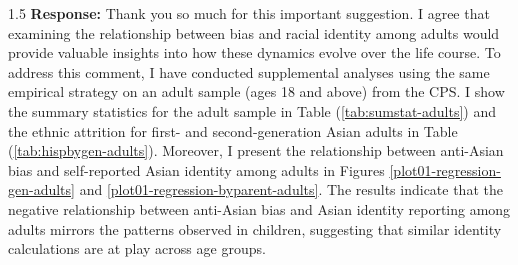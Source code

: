 \documentclass[12pt,english]{article}
\newcommand{\rrxspc}{1.5}
\begin{document}
\begin{refsection}
    \begin{spacing}{\rrxspc}
        \textbf{Response:} Thank you so much for this important suggestion. I agree that examining the relationship between bias and racial identity among adults would provide valuable insights into how these dynamics evolve over the life course. To address this comment, I have conducted supplemental analyses using the same empirical strategy on an adult sample (ages 18 and above) from the CPS. I show the summary statistics for the adult sample in Table (\ref{tab:sumstat-adults}) and the ethnic attrition for first- and second-generation Asian adults in Table (\ref{tab:hispbygen-adults}). Moreover, I present the relationship between anti-Asian bias and self-reported Asian identity among adults in Figures \ref{plot01-regression-gen-adults} and \ref{plot01-regression-byparent-adults}. The results indicate that the negative relationship between anti-Asian bias and Asian identity reporting among adults mirrors the patterns observed in children, suggesting that similar identity calculations are at play across age groups.


\end{spacing}
\end{refsection}
\end{document}
